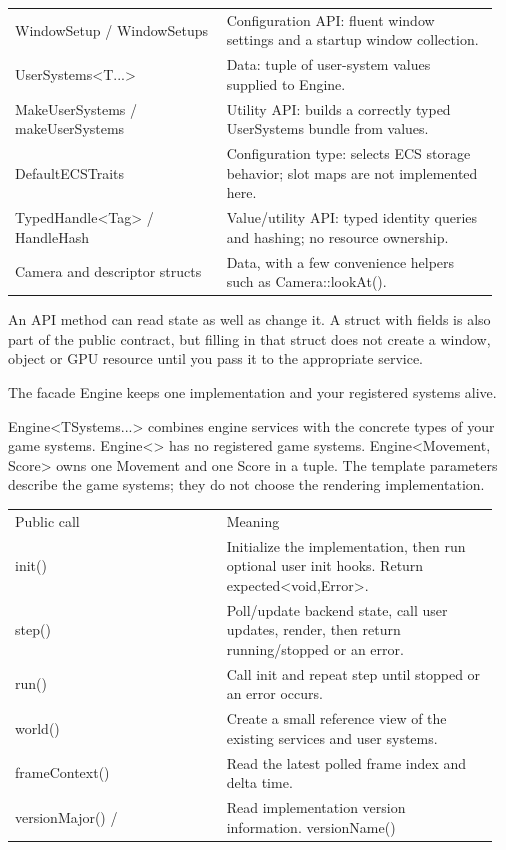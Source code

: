 \documentclass[11pt,a4paper]{article}
\begin{document}
{\begin{longtable}{@{}p{0.42\linewidth}p{0.54\linewidth}@{}}
WindowSetup / WindowSetups & Configuration API: fluent window settings and a startup window collection. \\
UserSystems<T...> & Data: tuple of user-system values supplied to Engine. \\
MakeUserSystems / makeUserSystems & Utility API: builds a correctly typed UserSystems bundle from values. \\
DefaultECSTraits & Configuration type: selects ECS storage behavior; slot maps are not implemented here. \\
TypedHandle<Tag> / HandleHash & Value/utility API: typed identity queries and hashing; no resource ownership. \\
Camera and descriptor structs & Data, with a few convenience helpers such as Camera::lookAt(). \\
\end{longtable}
}

An API method can read state as well as change it. A struct with fields is also part of the public contract, but filling in that struct does not create a window, object or GPU resource until you pass it to the appropriate service.

\label{core-6}
The facade Engine keeps one implementation and your registered systems alive.

Engine<TSystems...> combines engine services with the concrete types of your game systems. Engine<> has no registered game systems. Engine<Movement, Score> owns one Movement and one Score in a tuple. The template parameters describe the game systems; they do not choose the rendering implementation.

{\small
\begin{longtable}{@{}p{0.42\linewidth}p{0.54\linewidth}@{}}
Public call & Meaning \\
init() & Initialize the implementation, then run optional user init hooks. Return expected<void,Error>. \\
step() & Poll/update backend state, call user updates, render, then return running/stopped or an error. \\
run() & Call init and repeat step until stopped or an error occurs. \\
world() & Create a small reference view of the existing services and user systems. \\
frameContext() & Read the latest polled frame index and delta time. \\
versionMajor() / & Read implementation version information. versionName() \\
\end{longtable}
}
\end{document}

